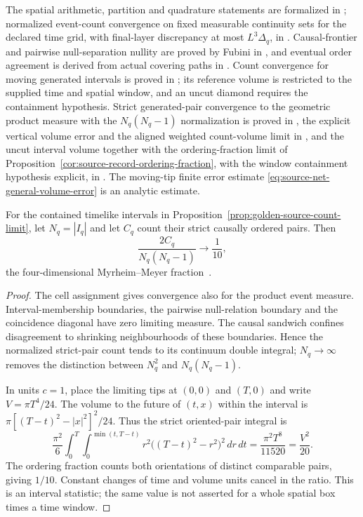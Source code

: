 The spatial arithmetic, partition and quadrature statements are formalized
in ; normalized event-count
convergence on fixed measurable continuity sets for the declared time grid,
with final-layer discrepancy at most $L^3\Delta_q$, in
. Causal-frontier and
pairwise null-separation nullity are proved by Fubini in
, and eventual order agreement
is derived from actual covering paths in
. Count convergence for moving
generated intervals is proved in
; its reference volume is
restricted to the supplied time and spatial window, and an uncut diamond
requires the containment hypothesis. Strict generated-pair convergence to
the geometric product measure with the $N_q(N_q-1)$ normalization is proved
in , the explicit vertical
volume error and the aligned weighted count-volume limit in
, and the uncut interval
volume together with the ordering-fraction limit of
Proposition~\ref{cor:source-record-ordering-fraction}, with the window
containment hypothesis explicit, in
. The moving-tip finite
error estimate \eqref{eq:source-net-general-volume-error} is an analytic
estimate.

\begin{proposition}
\label{cor:source-record-ordering-fraction}
For the contained timelike intervals in
Proposition~\ref{prop:golden-source-count-limit}, let $N_q=|I_q|$ and let
$C_q$ count their strict causally ordered pairs. Then
\[
 \frac{2C_q}{N_q(N_q-1)}\longrightarrow\frac1{10},
\]
the four-dimensional Myrheim--Meyer fraction~\cite{myrheim1978,meyer1988,reid2003}.
\end{proposition}
\begin{proof}
The cell assignment gives convergence also for the product event measure.
Interval-membership boundaries, the pairwise null-relation boundary and
the coincidence diagonal have zero limiting measure. The causal sandwich
confines disagreement to shrinking neighbourhoods of these boundaries.
Hence the normalized strict-pair count tends to its continuum double
integral; $N_q\to\infty$ removes the distinction between $N_q^2$ and
$N_q(N_q-1)$.

In units $c=1$, place the limiting tips at $(0,0)$ and $(T,0)$ and write
$V=\pi T^4/24$. The volume to the future of $(t,x)$ within the interval is
$\pi[(T-t)^2-|x|^2]^2/24$. Thus the strict oriented-pair integral is
\[
 \frac{\pi^2}{6}\int_0^T\!\int_0^{\min(t,T-t)}
       r^2\bigl((T-t)^2-r^2\bigr)^2\,dr\,dt
   =\frac{\pi^2T^8}{11520}=\frac{V^2}{20}.
\]
The ordering fraction counts both orientations of distinct comparable
pairs, giving $1/10$. Constant changes of time and volume units cancel in
the ratio. This is an interval statistic; the same value is not asserted
for a whole spatial box times a time window.
\end{proof}

